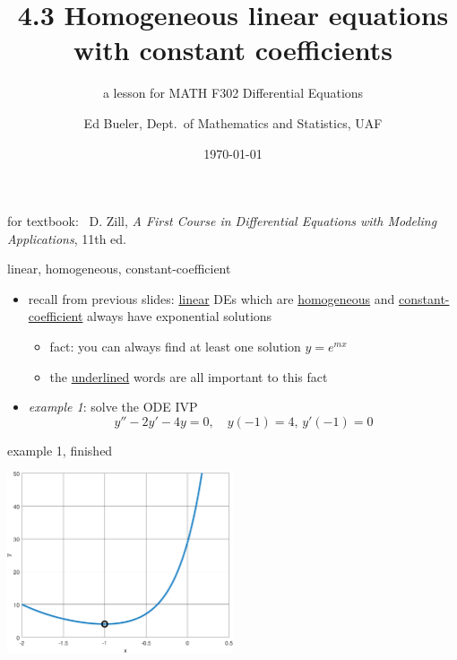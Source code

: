 \documentclass{beamer}
\title{4.3 Homogeneous linear equations \\ with constant coefficients}
\subtitle{a lesson for MATH F302 Differential Equations}
\author{Ed Bueler, Dept.~of Mathematics and Statistics, UAF}
\date{\tiny \today}
\begin{document}


\begin{frame}
\titlepage

\centerline{\tiny for textbook: \, D. Zill, \emph{A First Course in Differential Equations with Modeling Applications}, 11th ed.}
\end{frame}


\begin{frame}{linear, homogeneous, constant-coefficient}

\begin{itemize}
\item recall from previous slides: \underline{linear} DEs which are \underline{homogeneous} and \underline{constant-coefficient} always have exponential solutions
    \begin{itemize}
    \item fact: you can always find at least one solution $y=e^{mx}$
    \item the \underline{underlined} words are all important to this fact
    \end{itemize}
\item \emph{example 1}: solve the ODE IVP
    $$y'' -2 y' - 4 y = 0, \quad y(-1)=4, \, y'(-1)=0$$

\vspace{30mm}
\end{itemize}
\end{frame}


\begin{frame}{example 1, finished}

\vspace{35mm}

\hfill \includegraphics[width=0.5\textwidth]{figs/expodeivp2nd}
\end{frame}
\end{document}

